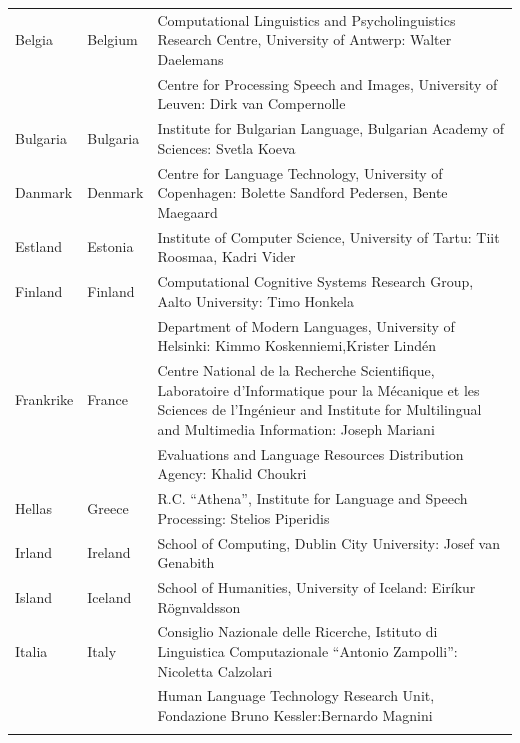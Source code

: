 \small
\begin{longtable}{llp{114mm}}
   Belgia & \textcolor{grey1}{Belgium} & Computational Linguistics and Psycholinguistics Research Centre, University of Antwerp: Walter Daelemans\\ \addlinespace
  & & Centre for Processing Speech and Images, University of Leuven: Dirk van Compernolle \\ \addlinespace
  Bulgaria & \textcolor{grey1}{Bulgaria} & Institute for Bulgarian Language, Bulgarian Academy of Sciences: Svetla Koeva \\ \addlinespace
  Danmark &  \textcolor{grey1}{Denmark} & Centre for Language Technology, University of Copenhagen: \newline Bolette Sandford Pedersen, Bente Maegaard\\ \addlinespace
  Estland & \textcolor{grey1}{Estonia} & Institute of Computer Science, University of Tartu: Tiit Roosmaa, Kadri Vider\\ \addlinespace
  Finland & \textcolor{grey1}{Finland} & Computational Cognitive Systems Research Group, Aalto University: Timo Honkela\\ \addlinespace
  & & Department of Modern Languages, University of Helsinki: Kimmo Koskenniemi,\newline Krister Lindén \\ \addlinespace
  Frankrike & \textcolor{grey1}{France} & Centre National de la Recherche Scientifique, Laboratoire d'Informatique pour la Mécanique et les Sciences de l'Ingénieur and Institute for Multilingual and Multimedia Information: Joseph Mariani \\ \addlinespace
  & & Evaluations and Language Resources Distribution Agency: Khalid Choukri\\ \addlinespace 
  Hellas & \textcolor{grey1}{Greece} & R.C. “Athena”, Institute for Language and Speech Processing: Stelios Piperidis\\ \addlinespace
  Irland & \textcolor{grey1}{Ireland} & School of Computing, Dublin City University: Josef van Genabith\\ \addlinespace
  Island & \textcolor{grey1}{Iceland} & School of Humanities, University of Iceland: Eiríkur Rögnvaldsson\\ \addlinespace
  Italia & \textcolor{grey1}{Italy} & Consiglio Nazionale delle Ricerche, Istituto di Linguistica Computazionale “Antonio Zampolli”: Nicoletta Calzolari\\ \addlinespace
  & & Human Language Technology Research Unit, Fondazione Bruno Kessler:\newline Bernardo Magnini\\ \addlinespace 

\end{longtable}
